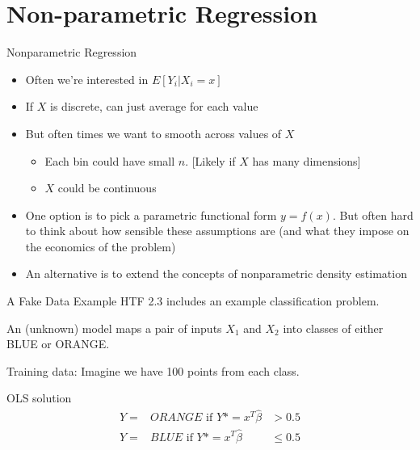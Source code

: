\section{Non-parametric Regression}

\begin{frame}{Nonparametric Regression}
  \begin{itemize}
  \item Often we're interested in $E\left[Y_i | X_i = x \right]$ 
  \item If $X$ is discrete, can just average for each value
  \item But often times we want to smooth across values of $X$
  \begin{itemize}
    \item Each bin could have small $n$. [Likely if $X$ has many dimensions]
    \item $X$ could be continuous  
  \end{itemize}
  \item One option is to pick a parametric functional form $y=f(x)$. But often hard to think about how sensible these assumptions are (and what they impose on the economics of the problem)
  \item An alternative is to extend the concepts of nonparametric density estimation
  \end{itemize}
\end{frame}

\begin{frame}{A Fake Data Example}
HTF 2.3 includes an example classification problem. 

An (unknown) model maps a pair of inputs $X_1$ and $X_2$ into classes of either BLUE or ORANGE. 

Training data: 
Imagine we have 100 points from each class. 

OLS solution 
\begin{eqnarray*}
Y=&ORANGE \mbox{ if } Y* = x^T\hat \beta &> 0.5 \\
Y=&BLUE  \mbox{ if }   Y* =  x^T\hat \beta &\leq 0.5
\end{eqnarray*}
\end{frame}


